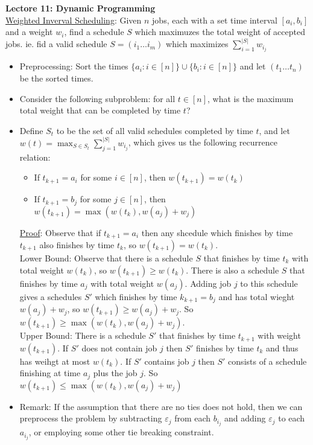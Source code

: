 \documentclass{article}
\begin{document}
\textbf{Lectore 11: Dynamic Programming} \\[1.0ex]
\underline{Weighted Inverval Scheduling}: Given $n$ jobs, each with a set time interval $[a_i, b_i]$ and a weight $w_i$, find a schedule $S$ which maximuzes the total weight of accepted jobs. ie. fid a valid schedule $S = (i_1 \dots i_m)$ which maximizes $\sum_{i = 1}^{|S|}w_{i_j}$
\begin{itemize}
    \item Preprocessing: Sort the times $\{a_i : i \in [n]\} \cup \{b_i : i \in [n]\}$ and let $(t_1 \dots t_n)$ be the sorted times. 
    \item Consider the following subproblem: for all $t \in [n]$, what is the maximum total weight that can be completed by time $t$?
    \item Define $S_t$ to be the set of all valid schedules completed by time $t$, and let $w(t) = \max_{S \in S_t} \sum_{j = 1}^{|S|}w_{i_j}$, which gives us the following recurrence relation: 
    \begin{itemize}
        \item If $t_{k + 1} = a_i$ for some $i \in [n]$, then $w(t_{k + 1}) = w(t_k)$
        \item If $t_{k + 1} = b_j$ for some $j \in [n]$, then $w(t_{k + 1}) = \max(w(t_k), w(a_j) + w_j)$
    \end{itemize}
    \underline{Proof}: Observe that if $t_{k + 1} = a_i$ then any shcedule which finishes by time $t_{k + 1}$ also finishes by time $t_k$, so $w(t_{k + 1}) = w(t_k)$. \\
    Lower Bound: Observe that there is a schedule $S$ that finishes by time $t_k$ with total weight $w(t_k)$, so $w(t_{k + 1}) \geq w(t_{k})$. There is also a schedule $S$ that finishes by time $a_j$ with total weight $w(a_j)$. Adding job $j$ to this schedule gives a schedules $S'$ which finishes by time $k_{k + 1} = b_j$ and has total wieght $w(a_j) + w_j$, so $w(t_{k + 1}) \geq w(a_j) + w_j$. So $w(t_{k + 1}) \geq \max(w(t_k), w(a_j) + w_j)$. \\ 
    Upper Bound: There is a schedule $S'$ that finishes by time $t_{k + 1}$ with weight $w(t_{k + 1})$. If $S'$ does not contain job $j$ then $S'$ finishes by time $t_k$ and thus has weihgt at most $w(t_k)$. If $S'$ contains job $j$ then $S'$ consists of a schedule finishing at time $a_j$ plus the job $j$. So $w(t_{k + 1}) \leq \max(w(t_k), w(a_j) + w_j)$
    \item Remark: If the assumption that there are no ties does not hold, then we can preprocess the problem by subtracting $\varepsilon_j$ from each $b_{i_j}$ and adding $\varepsilon_j$ to each $a_{i_j}$, or employing some other tie breaking constraint.
\end{itemize}
\end{document}
